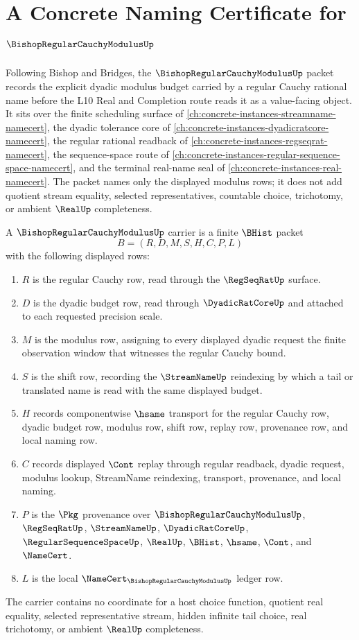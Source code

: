 \chapter{A Concrete Naming Certificate for $\BishopRegularCauchyModulusUp$}
\label{ch:concrete-instances-bishop-regular-cauchy-modulus-namecert}

Following Bishop and Bridges, the $\BishopRegularCauchyModulusUp$ packet records the explicit dyadic modulus budget carried by a regular Cauchy rational name before the L10 Real and Completion route reads it as a value-facing object. It sits over the finite scheduling surface of \autoref{ch:concrete-instances-streamname-namecert}, the dyadic tolerance core of \autoref{ch:concrete-instances-dyadicratcore-namecert}, the regular rational readback of \autoref{ch:concrete-instances-regseqrat-namecert}, the sequence-space route of \autoref{ch:concrete-instances-regular-sequence-space-namecert}, and the terminal real-name seal of \autoref{ch:concrete-instances-real-namecert}. The packet names only the displayed modulus rows; it does not add quotient stream equality, selected representatives, countable choice, trichotomy, or ambient $\RealUp$ completeness.

\begin{definition}
\label{def:bishop-regular-cauchy-modulus-carrier}
A $\BishopRegularCauchyModulusUp$ carrier is a finite $\BHist$ packet
$$
B=(R,D,M,S,H,C,P,L)
$$
with the following displayed rows:
\begin{enumerate}
\item $R$ is the regular Cauchy row, read through the $\RegSeqRatUp$ surface.
\item $D$ is the dyadic budget row, read through $\DyadicRatCoreUp$ and attached to each requested precision scale.
\item $M$ is the modulus row, assigning to every displayed dyadic request the finite observation window that witnesses the regular Cauchy bound.
\item $S$ is the shift row, recording the $\StreamNameUp$ reindexing by which a tail or translated name is read with the same displayed budget.
\item $H$ records componentwise $\hsame$ transport for the regular Cauchy row, dyadic budget row, modulus row, shift row, replay row, provenance row, and local naming row.
\item $C$ records displayed $\Cont$ replay through regular readback, dyadic request, modulus lookup, StreamName reindexing, transport, provenance, and local naming.
\item $P$ is the $\Pkg$ provenance over $\BishopRegularCauchyModulusUp$, $\RegSeqRatUp$, $\StreamNameUp$, $\DyadicRatCoreUp$, $\RegularSequenceSpaceUp$, $\RealUp$, $\BHist$, $\hsame$, $\Cont$, and $\NameCert$.
\item $L$ is the local $\NameCert_{\BishopRegularCauchyModulusUp}$ ledger row.
\end{enumerate}
The carrier contains no coordinate for a host choice function, quotient real equality, selected representative stream, hidden infinite tail choice, real trichotomy, or ambient $\RealUp$ completeness.
\end{definition}

